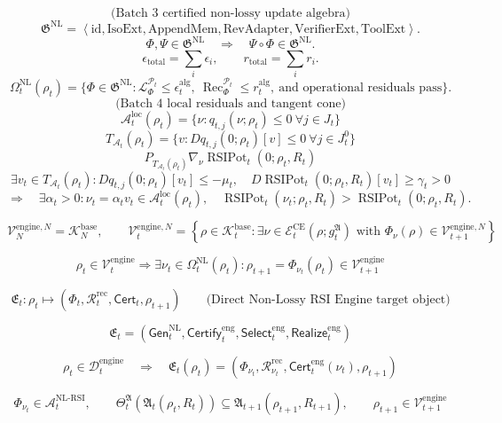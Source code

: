 \documentclass[11pt]{article}
\newcommand{\Acal}{\mathcal{A}}
\newcommand{\Pcal}{\mathcal{P}}
\newcommand{\Ecal}{\mathcal{E}}
\newcommand{\Rcal}{\mathcal{R}}
\newcommand{\Lcal}{\mathcal{L}}
\newcommand{\1}{\mathbf{1}}
\providecommand{\Dcal}{\mathcal{D}}
\providecommand{\Kcal}{\mathcal{K}}
\providecommand{\Vcal}{\mathcal{V}}
\providecommand{\Rec}{\operatorname{Rec}}
\begin{document}
\[
\text{(Batch 3 certified non-lossy update algebra)}
\]
\[
\mathfrak G^{\mathrm{NL}}
=
\left\langle
\mathrm{id},\mathrm{IsoExt},\mathrm{AppendMem},\mathrm{RevAdapter},\mathrm{VerifierExt},\mathrm{ToolExt}
\right\rangle.
\]
\[
\Phi,\Psi\in\mathfrak G^{\mathrm{NL}}
\quad\Longrightarrow\quad
\Psi\circ\Phi\in\mathfrak G^{\mathrm{NL}}.
\]
\[
\epsilon_{\mathrm{total}}=\sum_i\epsilon_i,
\qquad
r_{\mathrm{total}}=\sum_i r_i.
\]
\[
\Omega_t^{\mathrm{NL}}(\rho_t)
=
\{\Phi\in\mathfrak G^{\mathrm{NL}}:\Lcal_\Phi^{\Pcal_t}\le\epsilon_t^{\mathrm{alg}},\ \Rec_\Phi^{\Pcal_t}\le r_t^{\mathrm{alg}},\ \text{and operational residuals pass}\}.
\]
\[
\text{(Batch 4 local residuals and tangent cone)}
\]
\[
\mathcal A_t^{\mathrm{loc}}(\rho_t)=\{\nu:q_{t,j}(\nu;\rho_t)\le0\ \forall j\in J_t\}
\]
\[
T_{\mathcal A_t}(\rho_t)=\{v:Dq_{t,j}(0;\rho_t)[v]\le0\ \forall j\in J_t^0\}
\]
\[
P_{T_{\mathcal A_t}(\rho_t)}\nabla_\nu\operatorname{RSIPot}_t(0;\rho_t,R_t)
\]
\[
\exists v_t\in T_{\mathcal A_t}(\rho_t):
Dq_{t,j}(0;\rho_t)[v_t]\le-\mu_t,
\quad
D\operatorname{RSIPot}_t(0;\rho_t,R_t)[v_t]\ge\gamma_t>0
\]
\[
\Longrightarrow\quad
\exists\alpha_t>0:
\nu_t=\alpha_t v_t\in\mathcal A_t^{\mathrm{loc}}(\rho_t),
\quad
\operatorname{RSIPot}_t(\nu_t;\rho_t,R_t)>\operatorname{RSIPot}_t(0;\rho_t,R_t).
\]

\[
\Vcal_N^{\mathrm{engine},N}=\Kcal_N^{\mathrm{base}},
\qquad
\Vcal_t^{\mathrm{engine},N}
=
\left\{\rho\in\Kcal_t^{\mathrm{base}}:
\exists\nu\in\Ecal_t^{\mathrm{CE}}(\rho;g_t^{\mathfrak A})
\text{ with }
\Phi_\nu(\rho)\in\Vcal_{t+1}^{\mathrm{engine},N}\right\}
\]

\[
\rho_t\in\Vcal_t^{\mathrm{engine}}
\Longrightarrow
\exists\nu_t\in\Omega_t^{\mathrm{NL}}(\rho_t):
\rho_{t+1}=\Phi_{\nu_t}(\rho_t)\in\Vcal_{t+1}^{\mathrm{engine}}
\]

\[
\mathfrak E_t:\rho_t\longmapsto
(\Phi_t,\Rcal_t^{\mathrm{rec}},\mathsf{Cert}_t,\rho_{t+1})
\qquad
\text{(Direct Non-Lossy RSI Engine target object)}
\]


\[
\mathfrak E_t=(\mathsf{Gen}_t^{\mathrm{NL}},\mathsf{Certify}_t^{\mathrm{eng}},\mathsf{Select}_t^{\mathrm{eng}},\mathsf{Realize}_t^{\mathrm{eng}})
\]

\[
\rho_t\in\Dcal_t^{\mathrm{engine}}
\quad\Longrightarrow\quad
\mathfrak E_t(\rho_t)=
(\Phi_{\nu_t},\Rcal_{\nu_t}^{\mathrm{rec}},\mathsf{Cert}_t^{\mathrm{eng}}(\nu_t),\rho_{t+1})
\]

\[
\Phi_{\nu_t}\in\Acal_t^{\mathrm{NL\mbox{-}RSI}},
\qquad
\Theta_t^{\mathfrak A}(\mathfrak A_t(\rho_t,R_t))
\subseteq
\mathfrak A_{t+1}(\rho_{t+1},R_{t+1}),
\qquad
\rho_{t+1}\in\Vcal_{t+1}^{\mathrm{engine}}
\]
\end{document}
